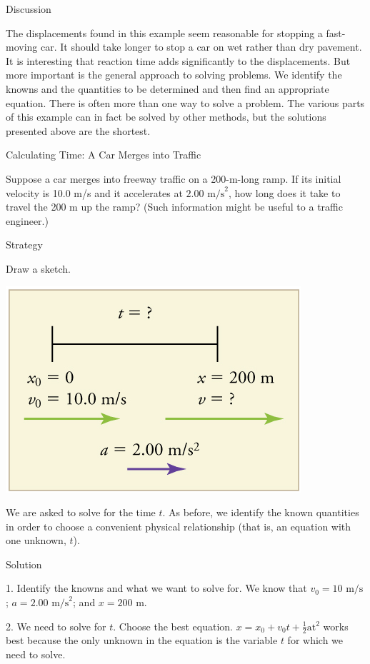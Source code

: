 \documentclass[
]{book}
\begin{document}
{Discussion}

The displacements found in this example seem reasonable for stopping a
fast-moving car. It should take longer to stop a car on wet rather than
dry pavement. It is interesting that reaction time adds significantly to
the displacements. But more important is the general approach to solving
problems. We identify the knowns and the quantities to be determined and
then find an appropriate equation. There is often more than one way to
solve a problem. The various parts of this example can in fact be solved
by other methods, but the solutions presented above are the shortest.

\hypertarget{fs-id1164906470852}{}
Calculating Time: A Car Merges into Traffic

Suppose a car merges into freeway traffic on a 200-m-long ramp. If its
initial velocity is 10.0 m/s and it accelerates at
\({2\text{.}\text{00\ m/s}^{2}}{}\), how long does it take to travel the
200 m up the ramp? (Such information might be useful to a traffic
engineer.)

{Strategy}

Draw a sketch.

\includegraphics{images/Figure_02_04_03a.jpg}

We are asked to solve for the time \(t{}\). As before, we identify the
known quantities in order to choose a convenient physical relationship
(that is, an equation with one unknown, \(t{}\)).

{Solution}

1. Identify the knowns and what we want to solve for. We know that
\({v_{0} = \text{10\ m/s}}{}\); \({{a = 2}\text{.}\text{00\ m/s}^{2}}{}\);
and \({x = \text{200\ m}}{}\).

2. We need to solve for \(t{}\). Choose the best equation.
\({{x = {x_{0} + v_{0}}}{t + \frac{1}{2}}\text{at}^{2}}{}\) works best
because the only unknown in the equation is the variable \(t{}\) for which
we need to solve.
\end{document}
